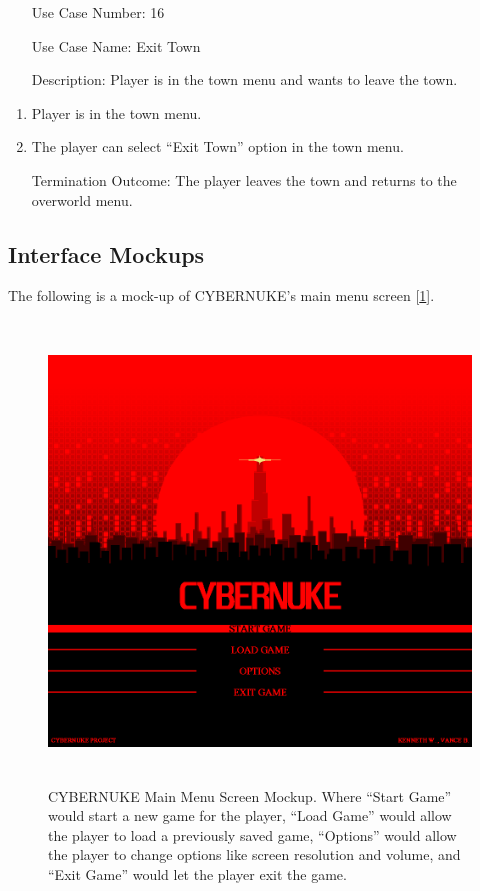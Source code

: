 \documentclass[10pt,conference,onecolumn,compsoc]{IEEEtran}
\begin{document}
\begin{itemize}
\item[Use Case Number:] 16
\item[Use Case Name:] Exit Town
\item[Description:] Player is in the town menu and wants to leave the town.
\end{itemize}
\begin{enumerate}
\item Player is in the town menu.
\item The player can select “Exit Town” option in the town menu.
\item [Termination Outcome:] The player leaves the town and returns to the overworld menu.
\end{enumerate}

\pagebreak
\subsection{Interface Mockups}

The following is a mock-up of CYBERNUKE's main menu screen [\ref{main_menu_mockup}].
\begin{figure}[ht!]
\centering
\includegraphics[height=462px, width=500px]{Mockups/CYBERNUKE_MAIN_MENU_2.png}
\caption{CYBERNUKE Main Menu Screen Mockup. Where “Start Game” would start a new game for the player, “Load Game” would allow the player to load a previously saved game, “Options” would allow the player to change options like screen resolution and volume, and “Exit Game” would let the player exit the game.}
\label{main_menu_mockup}
\end{figure}
\end{document}

